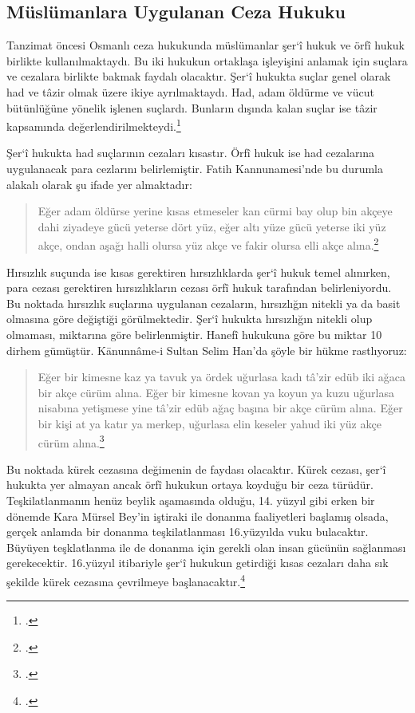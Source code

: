 \subsection{Müslümanlara Uygulanan Ceza Hukuku}
\indent\indent Tanzimat öncesi Osmanlı ceza hukukunda müslümanlar şer`î hukuk ve örfî hukuk birlikte kullanılmaktaydı. Bu iki hukukun ortaklaşa işleyişini
anlamak için suçlara ve cezalara birlikte bakmak faydalı olacaktır. Şer`î hukukta suçlar genel olarak had ve tâzir olmak üzere ikiye ayrılmaktaydı. Had,
adam öldürme ve vücut bütünlüğüne yönelik işlenen suçlardı. Bunların dışında kalan suçlar ise tâzir kapsamında değerlendirilmekteydi.\footcite[99]{osmanli_hukuku}

Şer`î hukukta had suçlarının cezaları kısastır. Örfî hukuk ise had cezalarına uygulanacak para cezlarını belirlemiştir. Fatih Kannunamesi'nde bu durumla alakalı olarak şu ifade yer almaktadır:
\begin{quote}
Eğer adam öldürse yerine kısas etmeseler kan cürmi bay olup bin akçeye dahi ziyadeye gücü yeterse dört yüz, eğer altı yüze gücü yeterse iki yüz akçe, ondan aşağı halli olursa yüz akçe ve fakir olursa elli akçe alına.\footcite[101]{osmanli_hukuku}
\end{quote}

Hırsızlık suçunda ise kısas gerektiren hırsızlıklarda şer`î hukuk temel alınırken, para cezası gerektiren hırsızlıkların cezası örfî hukuk tarafından belirleniyordu. Bu noktada hırsızlık suçlarına uygulanan 
cezaların, hırsızlığın nitekli ya da basit olmasına göre değiştiği görülmektedir. Şer`î hukukta hırsızlığın nitekli olup olmaması, miktarına göre belirlenmiştir. Hanefî hukukuna göre bu miktar 10 dirhem gümüştür.
Kānunnâme-i Sultan Selim Han'da şöyle bir hükme rastlıyoruz:
\begin{quote}
Eğer bir kimesne kaz ya tavuk ya ördek uğurlasa kadı tâ'zir edüb iki ağaca bir akçe cürüm alına. Eğer bir kimesne kovan ya koyun ya kuzu uğurlasa nisabına yetişmese yine tâ'zir edüb ağaç başına bir akçe cürüm alına. Eğer bir kişi at ya katır ya merkep, uğurlasa elin keseler yahud iki yüz akçe cürüm alına.\footcite[105]{osmanli_hukuku}
\end{quote}

Bu noktada kürek cezasına değimenin de faydası olacaktır. Kürek cezası, şer`î hukukta yer almayan ancak örfî hukukun ortaya koyduğu bir ceza türüdür. Teşkilatlanmanın henüz beylik aşamasında olduğu, 14. yüzyıl 
gibi erken bir dönemde Kara Mürsel Bey'in iştiraki ile donanma faaliyetleri başlamış olsada, gerçek anlamda bir donanma teşkilatlanması 16.yüzyılda vuku bulacaktır. Büyüyen teşklatlanma ile de donanma için gerekli 
olan insan gücünün sağlanması gerekecektir. 16.yüzyıl itibariyle şer`î hukukun getirdiği kısas cezaları daha sık şekilde kürek cezasına çevrilmeye başlanacaktır.\footcite[110]{osmanli_hukuku}

